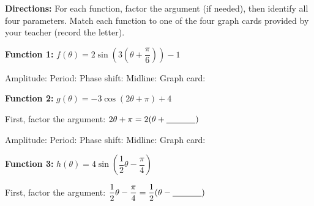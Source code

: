 \documentclass[10pt]{article}
\begin{document}
\begin{tcolorbox}[colback=white, colframe=black!40,
    title=\textbf{Tier A --- Apply},
    fonttitle=\bfseries, arc=2mm, left=3mm, right=3mm, top=2mm, bottom=2mm]

\textbf{Directions:} For each function, factor the argument (if needed),
then identify all four parameters. Match each function to one of the four
graph cards provided by your teacher (record the letter).

\vspace{6pt}
\textbf{Function 1:} $f(\theta) = 2\sin\!\left(3\!\left(\theta + \dfrac{\pi}{6}\right)\right) - 1$

\vspace{4pt}
Amplitude: \underline{\hspace{1.5cm}} \quad Period: \underline{\hspace{1.5cm}} \quad
Phase shift: \underline{\hspace{2.5cm}} \quad Midline: \underline{\hspace{1.5cm}} \quad Graph card: \underline{\hspace{0.8cm}}

\vspace{8pt}
\textbf{Function 2:} $g(\theta) = -3\cos(2\theta + \pi) + 4$

\vspace{4pt}
First, factor the argument: $2\theta + \pi = 2\!\left(\theta + \underline{\hspace{1.2cm}}\right)$

\vspace{4pt}
Amplitude: \underline{\hspace{1.5cm}} \quad Period: \underline{\hspace{1.5cm}} \quad
Phase shift: \underline{\hspace{2.5cm}} \quad Midline: \underline{\hspace{1.5cm}} \quad Graph card: \underline{\hspace{0.8cm}}

\vspace{8pt}
\textbf{Function 3:} $h(\theta) = 4\sin\!\left(\dfrac{1}{2}\theta - \dfrac{\pi}{4}\right)$

\vspace{4pt}
First, factor the argument: $\dfrac{1}{2}\theta - \dfrac{\pi}{4} = \dfrac{1}{2}\!\left(\theta - \underline{\hspace{1.2cm}}\right)$


\end{tcolorbox}
\end{document}
